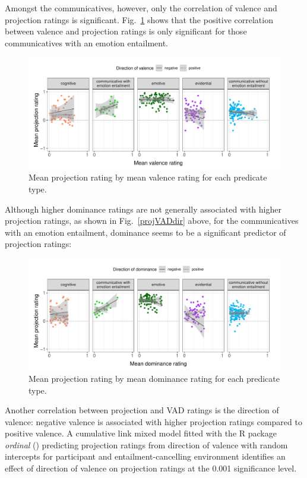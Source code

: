\documentclass[11pt,fleqn]{article}
\newcommand{\figref}[1]{Fig.~\ref{#1}}
\newcommand{\6}{\mbox{$[\hspace*{-.6mm}[$}}
\newcommand{\9}{\mbox{$]\hspace*{-.6mm}]$}}
\begin{document}
Amongst the communicatives, however, only the correlation of valence and projection ratings is significant. \figref{projvalfac} shows that the positive correlation between valence and projection ratings is only significant for those communicatives with an emotion entailment. 

\begin{figure}[H]
	\centering
	\includegraphics[width=1\textwidth]{projection-by-valence-faceted2}
	\caption{Mean projection rating by mean valence rating for each predicate type.}
	\label{projvalfac}
\end{figure}

Although higher dominance ratings are not generally associated with higher projection ratings, as shown in \figref{projVADdir} above, for the communicatives with an emotion entailment, dominance seems to be a significant predictor of projection ratings:
	
\begin{figure}[H]
	\centering
	\includegraphics[width=1\textwidth]{projection-by-dominance-faceted2}
	\caption{Mean projection rating by mean dominance rating for each predicate type.}
	\label{projdomfac}
\end{figure}

Another correlation between projection and VAD ratings is the direction of valence: negative valence is associated with higher projection ratings compared to positive valence. A cumulative link mixed model fitted with the R package \emph{ordinal} (\citealt{R-ordinal}) predicting projection ratings from direction of valence with random intercepts for participant and entailment-cancelling environment identifies an effect of direction of valence on projection ratings at the 0.001 significance level.
\end{document}
